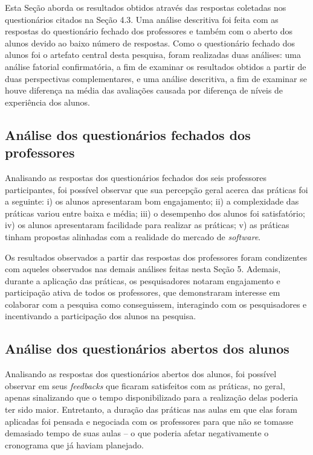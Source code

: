 Esta Seção aborda os resultados obtidos através das respostas coletadas nos questionários citados na Seção 4.3. Uma análise descritiva foi feita com as respostas do questionário fechado dos professores e também com o aberto dos alunos devido ao baixo número de respostas. Como o questionário fechado dos alunos foi o artefato central desta pesquisa, foram realizadas duas análises: uma análise fatorial confirmatória, a fim de examinar os resultados obtidos a partir de duas perspectivas complementares, e uma análise descritiva, a fim de examinar se houve diferença na média das avaliações causada por diferença de níveis de experiência dos alunos.

\subsection{Análise dos questionários fechados dos professores}

Analisando as respostas dos questionários fechados dos seis professores participantes, foi possível observar que sua percepção geral acerca das práticas foi a seguinte: i) os alunos apresentaram bom engajamento; ii) a complexidade das práticas variou entre baixa e média; iii) o desempenho dos alunos foi satisfatório; iv) os alunos apresentaram facilidade para realizar as práticas; v) as práticas tinham propostas alinhadas com a realidade do mercado de \textit{software}.

Os resultados observados a partir das respostas dos professores foram condizentes com aqueles observados nas demais análises feitas nesta Seção 5. Ademais, durante a aplicação das práticas, os pesquisadores notaram engajamento e participação ativa de todos os professores, que demonstraram interesse em colaborar com a pesquisa como conseguissem, interagindo com os pesquisadores e incentivando a participação dos alunos na pesquisa.

\subsection{Análise dos questionários abertos dos alunos}

Analisando as respostas dos questionários abertos dos alunos, foi possível observar em seus \textit{feedbacks} que ficaram satisfeitos com as práticas, no geral, apenas sinalizando que o tempo disponibilizado para a realização delas poderia ter sido maior. Entretanto, a duração das práticas nas aulas em que elas foram aplicadas foi pensada e negociada com os professores para que não se tomasse demasiado tempo de suas aulas -- o que poderia afetar negativamente o cronograma que já haviam planejado. 

